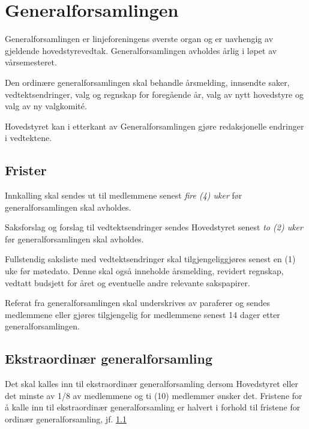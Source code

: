 \chapter{Generalforsamlingen}

Generalforsamlingen er linjeforeningens øverste organ og er uavhengig av gjeldende hovedstyrevedtak. Generalforsamlingen avholdes årlig i løpet av vårsemesteret.\newline

Den ordinære generalforsamlingen skal behandle årsmelding, innsendte saker, vedtektsendringer, valg og regnskap for foregående år, valg av nytt hovedstyre og valg av ny valgkomité.

Hovedstyret kan i etterkant av Generalforsamlingen gjøre redaksjonelle endringer i vedtektene.  

\section{Frister}
\label{sec:frister}
\begin{liste}
	\item Innkalling skal sendes ut til medlemmene senest \emph{fire (4) uker}  før \mbox{generalforsamlingen} skal avholdes.
	\item Saksforslag og forslag til vedtektsendringer sendes Hovedstyret senest \emph{to (2) uker} før generalforsamlingen skal avholdes.
	\item Fullstendig saksliste med vedtektsendringer skal tilgjengeliggjøres senest en (1) uke før møtedato. Denne skal også inneholde årsmelding, revidert regnskap, vedtatt budsjett for året og eventuelle andre relevante sakspapirer.
	\item Referat fra generalforsamlingen skal underskrives av paraferer og sendes \linebreak medlemmene eller gjøres tilgjengelig for medlemmene senest 14 dager etter generalforsamlingen.
\end{liste}


\section{Ekstraordinær generalforsamling}
\vspace{23pt}
Det skal kalles inn til ekstraordinær generalforsamling dersom Hovedstyret eller det minste av 1/8 av medlemmene og ti (10) medlemmer ønsker det. Fristene for å kalle inn til ekstraordinær generalforsamling er halvert i forhold til fristene for ordinær generalforsamling, jf. \ref{sec:frister}\newline


